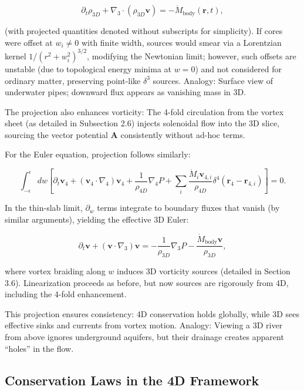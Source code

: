 \documentclass{article}
\begin{document}
\[
\partial_t \rho_{3D} + \nabla_3 \cdot (\rho_{3D} \mathbf{v}) = - \dot{M}_{\text{body}}(\mathbf{r}, t),
\]

(with projected quantities denoted without subscripts for simplicity). If cores were offset at $w_i \neq 0$ with finite width, sources would smear via a Lorentzian kernel $1/(r^2 + w_i^2)^{3/2}$, modifying the Newtonian limit; however, such offsets are unstable (due to topological energy minima at $w=0$) and not considered for ordinary matter, preserving point-like $\delta^3$ sources. Analogy: Surface view of underwater pipes; downward flux appears as vanishing mass in 3D.

The projection also enhances vorticity: The 4-fold circulation from the vortex sheet (as detailed in Subsection 2.6) injects solenoidal flow into the 3D slice, sourcing the vector potential $\mathbf{A}$ consistently without ad-hoc terms.

For the Euler equation, projection follows similarly:

\[
\int_{-\epsilon}^{\epsilon} dw \left[ \partial_t \mathbf{v}_4 + (\mathbf{v}_4 \cdot \nabla_4) \mathbf{v}_4 + \frac{1}{\rho_{4D}} \nabla_4 P + \sum_i \frac{\dot{M}_i \mathbf{v}_{4,i}}{\rho_{4D}} \delta^4(\mathbf{r}_4 - \mathbf{r}_{4,i}) \right] = 0.
\]

In the thin-slab limit, $\partial_w$ terms integrate to boundary fluxes that vanish (by similar arguments), yielding the effective 3D Euler:

\[
\partial_t \mathbf{v} + (\mathbf{v} \cdot \nabla_3) \mathbf{v} = -\frac{1}{\rho_{3D}} \nabla_3 P - \frac{\dot{M}_{\text{body}} \mathbf{v}}{\rho_{3D}},
\]

where vortex braiding along $w$ induces 3D vorticity sources (detailed in Section 3.6). Linearization proceeds as before, but now sources are rigorously from 4D, including the 4-fold enhancement.

This projection ensures consistency: 4D conservation holds globally, while 3D sees effective sinks and currents from vortex motion. Analogy: Viewing a 3D river from above ignores underground aquifers, but their drainage creates apparent ``holes'' in the flow.

\subsection{Conservation Laws in the 4D Framework}
\end{document}
